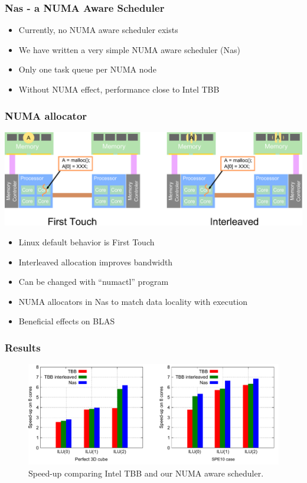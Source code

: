 \documentclass{beamer}
\begin{document}
\begin{frame}
  \frametitle{Nas - a NUMA Aware Scheduler}
  
  \begin{itemize}
    \item<1-> Currently, no NUMA aware scheduler exists
    \item<2-> We have written a very simple NUMA aware scheduler (Nas)
    \item<3-> Only one task queue per NUMA node
    \item<4-> Without NUMA effect, performance close to Intel TBB
  \end{itemize}
\end{frame}

\begin{frame}
  \frametitle{NUMA allocator}

  \centerline{\includegraphics[width=\linewidth]{alloc_numa}}
  
  \begin{itemize}
    \item<1-> Linux default behavior is First Touch
    \item<2-> Interleaved allocation improves bandwidth
    \item<3-> Can be changed with ``numactl'' program
    \item<4-> NUMA allocators in Nas to match data locality with execution
    \item<5-> Beneficial effects on BLAS
  \end{itemize}
\end{frame}

\begin{frame}
  \frametitle{Results}
  
  \begin{figure}[t!]
    \centering
    \includegraphics[width=\linewidth]{nas_cube_100_spe10}
    \caption{Speed-up comparing Intel TBB and our NUMA aware scheduler.}
  \end{figure}
\end{frame}
\end{document}
